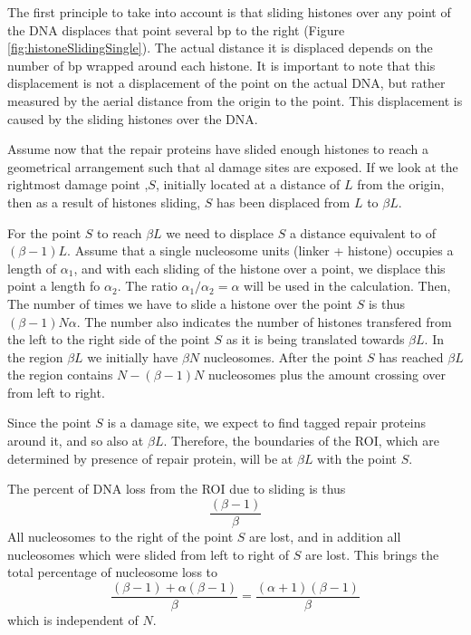 \documentclass[12pt]{paper}
\begin{document}
     The first principle to take into account is that sliding histones over any point of the DNA displaces that point several bp to the right (Figure \ref{fig:histoneSlidingSingle}). The actual distance it is displaced depends on the number of bp wrapped around each histone. It is important to note that this displacement is not a displacement of the point on the actual DNA, but rather measured by the aerial distance from the origin to the point. This displacement is caused by the sliding histones over the DNA.
     
     Assume now that the repair proteins have slided enough histones to reach a geometrical arrangement such that al damage sites are exposed. If we look at the rightmost damage point ,$S$, initially located at a distance of $L$ from the origin, then as a result of histones sliding, $S$ has been displaced from $L$ to $\beta L$. 
     
     For the point $S$ to reach $\beta L$ we need to displace $S$ a distance equivalent to of $(\beta-1)L$. Assume that a single nucleosome units (linker + histone) occupies a length of $\alpha_1$, and with each sliding of the histone over a point, we displace this point a length fo $\alpha_2$. The ratio $\alpha_1/\alpha_2 =\alpha$ will be used in the calculation. Then, The number of times we have to slide a histone over the point $S$ is thus $(\beta-1)N\alpha$.
     The number also indicates the number of histones transfered from the left to the right side of the point $S$ as it is being translated towards $\beta L$.
     In the region $\beta L$ we initially have $\beta N$ nucleosomes. After the point $S$ has reached $\beta L$ the region contains $N-(\beta-1)N$ nucleosomes plus the amount crossing over from left to right. 
     
     Since the point $S$ is a damage site, we expect to find tagged repair proteins around it, and so also at $\beta L$. Therefore, the  boundaries of the ROI, which are determined by presence of repair protein, will be at $\beta L$ with the point $S$. 
     
     The percent of DNA loss from the ROI due to sliding is thus 
     \begin{equation}
     \frac{(\beta-1)}{\beta}
     \end{equation}
     All nucleosomes to the right of the point $S$ are lost, and in addition all nucleosomes which were slided from left to right of $S$ are lost. This brings the total percentage of nucleosome loss to 
     \begin{equation*}
     \frac{(\beta-1) +\alpha(\beta -1)}{\beta}= \frac{(\alpha+1)(\beta -1)}{\beta}
     \end{equation*}
     which is independent of $N$.
     
\end{document}
